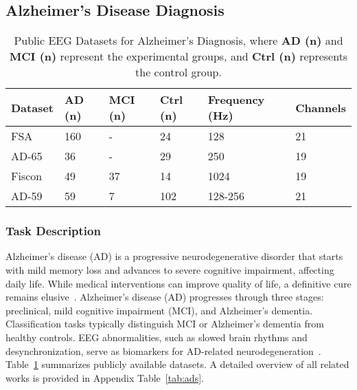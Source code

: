 


\subsection{Alzheimer's Disease Diagnosis}
\begin{table}[t]
\renewcommand{\arraystretch}{1.2}
\caption{Public EEG Datasets for Alzheimer's Diagnosis, where \textbf{AD (n)} and \textbf{MCI (n)} represent the experimental groups, and \textbf{Ctrl (n)} represents the control group.}
\label{tab:ad}
\footnotesize
\centering
\begin{tabular}{p{50pt}p{20pt}p{20pt}p{20pt}p{30pt}p{30pt}}
\hline
\textbf{Dataset}            & \textbf{AD (n)} & \textbf{MCI (n)} & \textbf{Ctrl (n)} & \textbf{Frequency (Hz)} & \textbf{Channels} \\
\hline
FSA~\cite{ds_FSA_AD}        & 160            & -               & 24               & 128              & 21                \\
AD-65~\cite{ds004504:1.0.2} & 36             & -               & 29               & 250              & 19                \\
Fiscon~\cite{fiscon}         & 49             & 37              & 14               & 1024             & 19                \\
AD-59~\cite{cejnek2021novelty} & 59            & 7               & 102              & 128-256          & 21                \\
\hline
\end{tabular}
\end{table}

\subsubsection{Task Description}
Alzheimer’s disease (AD) is a progressive neurodegenerative disorder that starts with mild memory loss and advances to severe cognitive impairment, affecting daily life. While medical interventions can improve quality of life, a definitive cure remains elusive~\cite{better2024alzheimer}. 
Alzheimer’s disease (AD) progresses through three stages: preclinical, mild cognitive impairment (MCI), and Alzheimer’s dementia.
Classification tasks typically distinguish MCI or Alzheimer’s dementia from healthy controls. 
EEG abnormalities, such as slowed brain rhythms and desynchronization, serve as biomarkers for AD-related neurodegeneration~\cite{labate2014eeg}. Table~\ref{tab:ad} summarizes publicly available datasets.
A detailed overview of all related works is provided in Appendix Table~\ref{tab:ads}.

